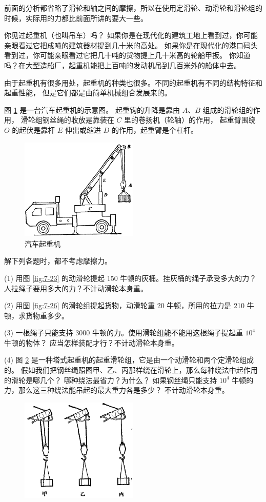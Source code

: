 前面的分析都省略了滑轮和轴之间的摩擦，所以在使用定滑轮、动滑轮和滑轮组的时候，实际用的力都比前面所讲的要大一些。




你见过起重机（也叫吊车）吗？
如果你是在现代化的建筑工地上看到过，你可能亲眼看过它把成吨的建筑器材提到几十米的高处。
如果你是在现代化的港口码头看到过，你可能亲眼看过它把几十吨的货物提上几十米高的轮船甲扳。
你知道吗？在大型造船厂，起重机能把上百吨的发动机吊到几百米外的船体中去。

由于起重机有很多用处，起重机的种类也很多。不同的起重机有不同的结构特征和起重性能，
但是它们都是由简单机械组合发展来的。

图 \ref{fig:7-28} 是一台汽车起重机的示意图。
起重钩的升降是靠由 $A$、$B$ 组成的滑轮组的作用，
滑轮组钢丝绳的收放是靠装在 $C$ 里的卷扬机（轮轴）的作用，
起重臂围绕 $O$ 的起伏是靠杆 $E$ 伸出或缩进 $D$ 的作用，起重臂是个杠杆。


\begin{figure}[htbp]
    \centering
    \includegraphics[width=0.5\textwidth]{../pic/czwl1-ch7-28}
    \caption{汽车起重机}\label{fig:7-28}
\end{figure}


\lianxi

解下列各题时，都不考虑摩擦力。

(1) 用图 \ref{fig:7-23} 的动滑轮提起 150 牛顿的灰桶。挂灰桶的绳子承受多大的力？
人拉绳子要用多大的力？不计动滑轮本身重。

(2) 用图 \ref{fig:7-26} 的滑轮组提起货物，动滑轮重 20 牛顿，所用的拉力是 210 牛顿，求货物重多少。

(3) 一根绳子只能支持 3000 牛顿的力。使用滑轮组能不能用这根绳子提起重 $10^4$ 牛顿的物体？
应当怎样装配才行？不计动滑轮本身重。

(4) 图 \ref{fig:7-29} 是一种塔式起重机的起重滑轮组，它是由一个动滑轮和两个定滑轮组成的。
假如我们把钢丝绳照图甲、乙、丙那样绕在滑轮上，那么每种绕法中起作用的滑轮是哪几个？
哪种绕法最省力？为什么？
如果钢丝绳只能支持 $10^4$ 牛顿的力，那么这三种绕法能吊起的最大重力各是多少？
不计动滑轮本身重。

\begin{figure}[htbp]
    \centering
    \includegraphics[width=0.5\textwidth]{../pic/czwl1-ch7-29}
    \caption{}\label{fig:7-29}
\end{figure}


